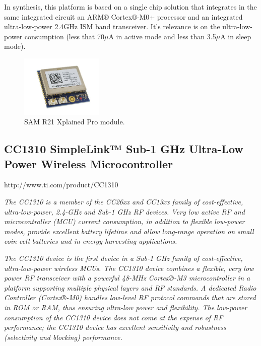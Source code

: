 In synthesis, this platform is based on a single chip solution that integrates in the same integrated circuit an ARM® Cortex®-M0+ processor and an integrated ultra-low-power 2.4GHz ISM
band transceiver. It's relevance is on the ultra-low-power consumption (less that 70$\mu$A in active mode and less than 3.5$\mu$A in sleep mode).

\begin{figure}[h!]
	\centering
	\includegraphics[width=0.35\textwidth,keepaspectratio]{figures/samr21}
	\caption{SAM R21 Xplained Pro module.}

\end{figure}


\subsection{CC1310 SimpleLink™ Sub-1 GHz Ultra-Low Power Wireless Microcontroller}

\begin{framed}
	
	http://www.ti.com/product/CC1310
	
	\vspace{1em}
	\hline
	\vspace{1em}
\small	
	\textit{The CC1310 is a member of the CC26xx and CC13xx family of cost-effective, ultra-low-power, 2.4-GHz and Sub-1 GHz RF devices. Very low active RF and microcontroller (MCU) current consumption, in addition to flexible low-power modes, provide excellent battery lifetime and allow long-range operation on small coin-cell batteries and in energy-harvesting applications.}
		
	\textit{The CC1310 device is the first device in a Sub-1 GHz family of cost-effective, ultra-low-power wireless MCUs. The CC1310 device combines a flexible, very low power RF transceiver with a powerful 48-MHz Cortex®-M3 microcontroller in a platform supporting multiple physical layers and RF standards. A dedicated Radio Controller (Cortex®-M0) handles low-level RF protocol commands that are stored in ROM or RAM, thus ensuring ultra-low power and flexibility. The low-power consumption of the CC1310 device does not come at the expense of RF performance; the CC1310 device has excellent sensitivity and robustness (selectivity and blocking) performance.}
		
\end{framed}




